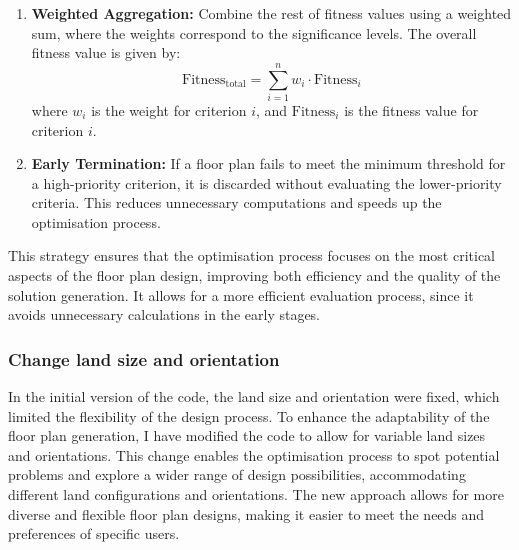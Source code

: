 \documentclass[]{article}
\begin{document}
\begin{enumerate}
    \item \textbf{Weighted Aggregation:} Combine the rest of fitness values using a weighted sum, where the weights correspond to the significance levels. The overall fitness value is given by:
          \begin{equation*}
              \text{Fitness}_{\text{total}} = \sum_{i=1}^{n} w_i \cdot \text{Fitness}_i
          \end{equation*}
          where $w_i$ is the weight for criterion $i$, and $\text{Fitness}_i$ is the fitness value for criterion $i$.
    \item \textbf{Early Termination:} If a floor plan fails to meet the minimum threshold for a high-priority criterion, it is discarded without evaluating the lower-priority criteria. This reduces unnecessary computations and speeds up the optimisation process.
\end{enumerate}

This strategy ensures that the optimisation process focuses on the most critical aspects of the floor plan design, improving both efficiency and the quality of the solution generation.
It allows for a more efficient evaluation process, since it avoids unnecessary calculations in the early stages.

\subsubsection{Change land size and orientation}
In the initial version of the code, the land size and orientation were fixed, which limited the flexibility of the design process. To enhance the adaptability of the floor plan generation, I have modified the code to allow for variable land sizes and orientations. This change enables the optimisation process to spot potential problems and explore a wider range of design possibilities, accommodating different land configurations and orientations. The new approach allows for more diverse and flexible floor plan designs, making it easier to meet the needs and preferences of specific users.
\end{document}

